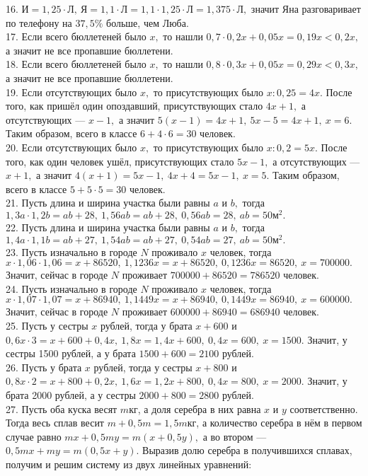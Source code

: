 16. $\text{И}=1,25\cdot\text{Л},\ \text{Я}=1,1\cdot\text{Л}=1,1\cdot1,25\cdot\text{Л}=1,375\cdot\text{Л},$ значит Яна разговаривает по телефону на $37,5\%$ больше, чем Люба.\\
17. Если всего бюллетеней было $x,$ то нашли $0,7\cdot0,2x+0,05x=0,19x<0,2x,$ а значит не все пропавшие бюллетени.\\
18. Если всего бюллетеней было $x,$ то нашли $0,8\cdot0,3x+0,05x=0,29x<0,3x,$ а значит не все пропавшие бюллетени.\\
19. Если отсутствующих было $x,$ то присутствующих было $x:0,25=4x.$ После того, как пришёл один опоздавший, присутствующих стало $4x+1,$ а отсутствующих --- $x-1,$ а значит $5(x-1)=4x+1,\ 5x-5=4x+1,\ x=6.$ Таким образом, всего в классе $6+4\cdot6=30$ человек.\\
20. Если отсутствующих было $x,$ то присутствующих было $x:0,2=5x.$ После того, как один человек ушёл, присутствующих стало $5x-1,$ а отсутствующих --- $x+1,$ а значит $4(x+1)=5x-1,\ 4x+4=5x-1,\ x=5.$ Таким образом, всего в классе $5+5\cdot5=30$ человек.\\
21. Пусть длина и ширина участка были равны $a$ и $b,$ тогда $1,3a\cdot1,2b=ab+28,\ 1,56ab=ab+28,\ 0,56ab=28,\ ab=50\text{м}^2.$\\
22. Пусть длина и ширина участка были равны $a$ и $b,$ тогда $1,4a\cdot1,1b=ab+27,\ 1,54ab=ab+27,\ 0,54ab=27,\ ab=50\text{м}^2.$\\
23. Пусть изначально в городе $N$ проживало $x$ человек, тогда $x\cdot1,06\cdot1,06=x+86520,\ 1,1236x=x+86520,\ 0,1236x=86520,\ x=700000.$ Значит, сейчас в городе $N$ проживает $700000+86520=786520$ человек.\\
24. Пусть изначально в городе $N$ проживало $x$ человек, тогда $x\cdot1,07\cdot1,07=x+86940,\ 1,1449x=x+86940,\ 0,1449x=86940,\ x=600000.$ Значит, сейчас в городе $N$ проживает $600000+86940=686940$ человек.\\
25. Пусть у сестры $x$ рублей, тогда у брата $x+600$ и $0,6x\cdot3=x+600+0,4x,\ 1,8x=1,4x+600,\ 0,4x=600,\ x=1500.$ Значит, у сестры 1500 рублей, а у брата $1500+600=2100$ рублей.\\
26. Пусть у брата $x$ рублей, тогда у сестры $x+800$ и $0,8x\cdot2=x+800+0,2x,\ 1,6x=1,2x+800,\ 0,4x=800,\ x=2000.$ Значит, у брата 2000 рублей, а у сестры $2000+800=2800$ рублей.\\
27. Пусть оба куска весят $m$кг, а доля серебра в них равна $x$ и $y$ соответственно. Тогда весь сплав весит $m+0,5m=1,5m$кг, а количество серебра в нём в первом случае равно $mx+0,5my=m(x+0,5y),$ а во втором --- $0,5mx+my=m(0,5x+y).$ Выразив долю серебра в получившихся сплавах, получим и решим систему из двух линейных уравнений:\\
